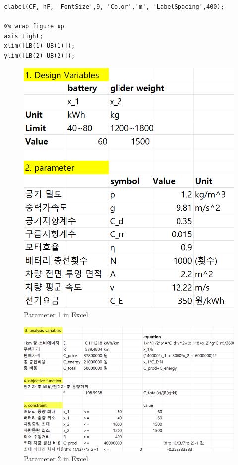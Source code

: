 \documentclass[11pt,twocolumn]{article}
\begin{document}
\begin{enumerate}
\begin{lstlisting}[firstnumber=last]
clabel(CF, hF, 'FontSize',9, 'Color','m', 'LabelSpacing',400);

%% wrap figure up
axis tight;
xlim([LB(1) UB(1)]);
ylim([LB(2) UB(2)]);
                    \end{lstlisting}
                \end{enumerate}

                \begin{figure}[h]
                        \centering
                        \includegraphics[width=.6\columnwidth]{Excel111.png}
                        \caption{Parameter 1 in Excel.}
                        \label{param1}
                \end{figure}

                \begin{figure}[h]
                        \centering
                        \includegraphics[width=.8\columnwidth]{Excel22.png}
                        \caption{Parameter 2 in Excel.}
                        \label{param2}
                \end{figure}
                
\end{document}
